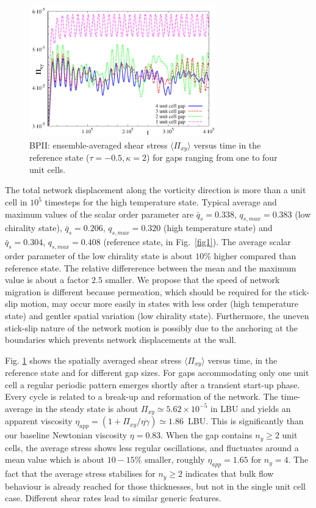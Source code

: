 \documentclass[12pt,twoside]{iopart}
\newcommand{\ex}[1]{\times10^{#1}}
\begin{document}
\begin{figure}[t]
\centering
\includegraphics[width=0.725\textwidth]{stress_bp2_fbc.pdf}
\caption{BPII: ensemble-averaged shear stress $\langle \Pi_{xy}\rangle$
versus time in the reference state ($\tau=-0.5, \kappa=2$) for gaps ranging
from one to four unit cells.}
\label{fig3}
\end{figure}

The total network displacement along the vorticity direction is more than
a unit cell in $10^5$ timesteps for the high temperature state.
Typical average and maximum values of the scalar order parameter are
$\bar{q}_s=0.338$, $q_{s,max}=0.383$ (low chirality state), 
$\bar{q}_s=0.206$, $q_{s,max}=0.320$ (high temperature state) and
$\bar{q}_s=0.304$, $q_{s,max}=0.408$ (reference state, in Fig.~\ref{fig1}).
The average scalar order parameter of the low chirality state is about
$10\%$ higher compared than reference state. The  relative differerence
between the mean and the maximum value is about a factor $2.5$ smaller.
We propose that the speed of network migration is different because
permeation, which should be required for the stick-slip motion, may occur
more easily in states with less order (high temperature state) and gentler
spatial variation (low chirality state). Furthermore, the uneven stick-slip
nature of the network motion is possibly due to the anchoring at the
boundaries which prevents network displacements at the wall. 

Fig. \ref{fig3} shows the spatially averaged shear stress $\langle \Pi_{xy}\rangle$ versus time, in the reference state and for different gap sizes.
For gaps accommodating only one unit cell a regular periodic pattern emerges shortly after a transient start-up phase.
Every cycle is related to a break-up and reformation of the network.
The time-average in the steady state is about $\Pi_{xy}\simeq5.62\ex{-5}$
in LBU and yields an apparent viscosity
$\eta_{app}=(1 +\Pi_{xy}/\eta\dot{\gamma})\simeq 1.86$~LBU. This is
significantly than our baseline Newtonian viscosity $\eta = 0.83$.
When the gap contains $n_y\ge2$ unit cells, the average stress shows
less regular oscillations, and fluctuates around a mean value which is
about $10-15\%$ smaller, roughly $\eta_{app}=1.65$ for $n_y=4$. The fact
that the average stress stabilises for $n_y\ge2$ indicates that bulk flow
behaviour is already reached for those thicknesses, but not in the single
unit cell case. Different shear rates lead to similar generic features.
\end{document}
